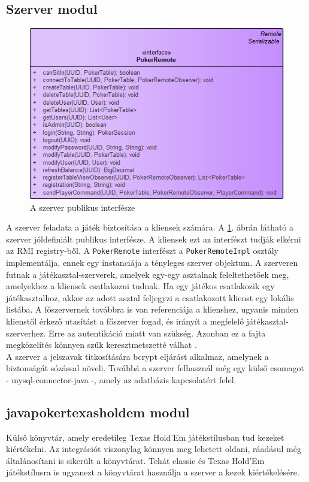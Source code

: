 \subsection{Szerver modul}
\begin{figure}[h!]
  \caption{A szerver publikus interfésze}
  \label{fig:server_public}
  \centering
    \includegraphics[width=\textwidth]{developer-documentation/images/server_remote.png}
\end{figure}
A szerver feladata a játék biztosítása a kliensek számára. A \ref{fig:server_public}. ábrán látható a szerver jóldefiniált publikus interfésze. A kliensek ezt az interfészt tudják elkérni az RMI registry-ből. A \texttt{PokerRemote} interfészt a \texttt{PokerRemoteImpl} osztály implementálja, ennek egy instanciája a tényleges szerver objektum. A szerveren futnak a játékasztal-szerverek, amelyek egy-egy asztalnak feleltethetőek meg, amelyekhez a kliensek csatlakozni tudnak. Ha egy játékos csatlakozik egy játékasztalhoz, akkor az adott asztal feljegyzi a csatlakozott klienst egy lokális listába. A főszervernek továbbra is van referenciája a klienshez, ugyanis minden klienstől érkező utasítást a főszerver fogad, és irányít a megfelelő játékasztal-szerverhez. Erre az autentikáció miatt van szükség. Azonban ez a fajta megközelítés könnyen szűk keresztmetszetté válhat \cite{bottleneck}. \\
A szerver a jelszavak titkosítására bcrypt \cite{bcrypt} eljárást alkalmaz, amelynek a biztonságát sózással növeli. Továbbá a szerver felhasznál még egy külső csomagot - mysql-connector-java -, amely az adatbázis kapcsolatért felel.

\subsection{javapokertexasholdem modul}
Külső könyvtár, amely eredetileg Texas Hold'Em játékstílusban tud kezeket kiértékelni. Az integrációt viszonylag könnyen meg lehetett oldani, ráadásul még általánosítani is sikerült a könyvtárat. Tehát classic és Texas Hold'Em játékstílusra is ugyanezt a könyvtárat használja a szerver a kezek kiértékelésére.

